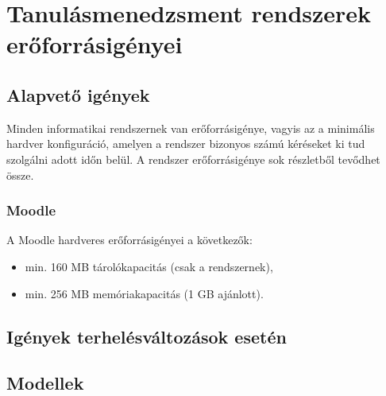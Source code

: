\chapter{Tanulásmenedzsment rendszerek erőforrásigényei}
\section{Alapvető igények}

Minden informatikai rendszernek van erőforrásigénye, vagyis az a minimális hardver konfiguráció, amelyen a rendszer bizonyos számú kéréseket ki tud szolgálni adott időn belül. 
A rendszer erőforrásigénye sok részletből tevődhet össze. 

\subsection{Moodle}
A Moodle hardveres erőforrásigényei a következők:
\begin{itemize}
\item{min. 160 MB tárolókapacitás (csak a rendszernek),}
\item{min. 256 MB memóriakapacitás (1 GB ajánlott).}
\end{itemize}


\section{Igények terhelésváltozások esetén}
\todo{}
\section{Modellek}
\todo{}
